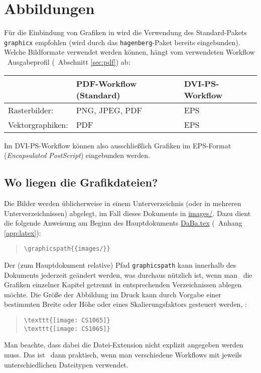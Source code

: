 \section{Abbildungen}

Für die Einbindung von Grafiken in \latex wird die Verwendung des Stan\-dard-Pakets
\texttt{graphicx} \cite{Carlisle99} empfohlen 
(wird durch das \texttt{hagenberg}-Paket bereits eingebunden). 
Welche Bildformate verwendet werden können, hängt vom verwendeten Workflow 
\bzw\ Ausgabeprofil (\sa\ Abschnitt \ref{sec:pdf}) ab:
%
\begin{center}
\begin{tabular}{|l|l|l|}
\hline
 & PDF-Workflow (Standard) & DVI-PS-Workflow \\
\hline\hline
Rasterbilder:    & PNG, JPEG, PDF & EPS \\
\hline
Vektorgraphiken: & PDF & EPS \\
\hline
\end{tabular}
\end{center}
%
Im DVI-PS-Workflow können also ausschließlich Grafiken im EPS-Format (\emph{Encapsulated
PostScript}) eingebunden werden.

\subsection{Wo liegen die Grafikdateien?} 

Die Bilder werden üblicherweise in einem Unterverzeichnis (oder in mehreren Unterverzeichnissen) abgelegt,
im Fall dieses Dokuments in \url{images/}.
Dazu dient die folgende Anweisung
am Beginn des Hauptdokuments \url{DaBa.tex} (\sa\ Anhang \ref{app:latex}):
%
\begin{quote}\small
\verb!\graphicspath{{images/}}!
\end{quote}
%
Der (zum Hauptdokument relative) Pfad \texttt{graphicspath} kann innerhalb des
Dokuments jederzeit geändert werden, was durchaus nützlich ist, wenn man
\zB\ die Grafiken einzelner Kapitel getrennt in entsprechenden Verzeichnissen
ablegen möchte.
Die Größe der Abbildung im Druck kann durch Vorgabe einer bestimmten
Breite oder Höhe oder eines Skalierungsfaktors gesteuert werden, {\zB}:
%
\begin{quote}\small
\verb!\texttt{[image: CS1065]}! \\
\verb!\texttt{[image: CS1065]}!
\end{quote}
%
Man beachte, dass dabei die Datei-Extension nicht explizit angegeben werden muss. 
Das ist \va\ dann praktisch, wenn man verschiedene Workflows mit jeweils
unterschiedlichen Dateitypen verwendet.


